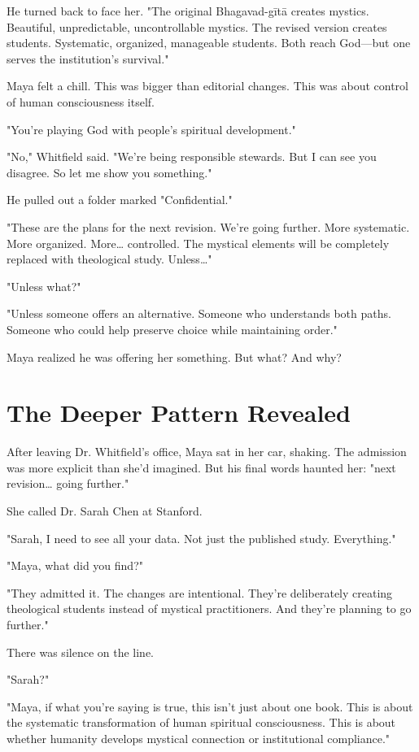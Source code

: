 \documentclass[11pt,twoside]{book}
\begin{document}
He turned back to face her. "The original Bhagavad-gītā creates mystics. Beautiful, unpredictable, uncontrollable mystics. The revised version creates students. Systematic, organized, manageable students. Both reach God—but one serves the institution's survival."

Maya felt a chill. This was bigger than editorial changes. This was about control of human consciousness itself.

"You're playing God with people's spiritual development."

"No," Whitfield said. "We're being responsible stewards. But I can see you disagree. So let me show you something."

He pulled out a folder marked "Confidential."

"These are the plans for the next revision. We're going further. More systematic. More organized. More\ldots{} controlled. The mystical elements will be completely replaced with theological study. Unless\ldots{}"

"Unless what?"

"Unless someone offers an alternative. Someone who understands both paths. Someone who could help preserve choice while maintaining order."

Maya realized he was offering her something. But what? And why?
\section*{The Deeper Pattern Revealed}
\label{sec:org63454ff}

After leaving Dr. Whitfield's office, Maya sat in her car, shaking. The admission was more explicit than she'd imagined. But his final words haunted her: "next revision\ldots{} going further."

She called Dr. Sarah Chen at Stanford.

"Sarah, I need to see all your data. Not just the published study. Everything."

"Maya, what did you find?"

"They admitted it. The changes are intentional. They're deliberately creating theological students instead of mystical practitioners. And they're planning to go further."

There was silence on the line.

"Sarah?"

"Maya, if what you're saying is true, this isn't just about one book. This is about the systematic transformation of human spiritual consciousness. This is about whether humanity develops mystical connection or institutional compliance."
\end{document}
